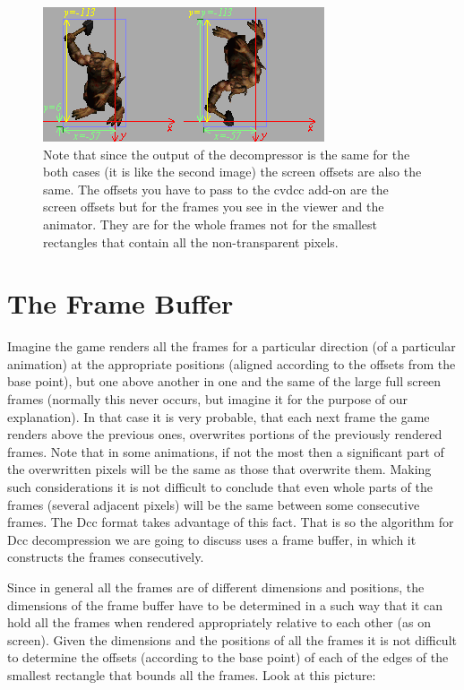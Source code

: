	
\begin{figure}[!h]
  \includegraphics[width=\linewidth]{scroffs.png}
  \caption{
Note that since the output of the decompressor is the same for the both cases 
(it is like the second image) the screen offsets are also the same. The offsets 
you have to pass to the cvdcc add-on are the screen offsets but for the frames 
you see in the viewer and the animator. They are for the whole frames not for 
the smallest rectangles that contain all the non-transparent pixels.
}
  \label{fig:offsets}
\end{figure}


\newpage
\section{The Frame Buffer}
Imagine the game renders all the frames for a particular direction (of a 
particular animation) at the appropriate positions (aligned according to the 
offsets from the base point), but one above another in one and the same of the 
large full screen frames (normally this never occurs, but imagine it for the 
purpose of our explanation). In that case it is very probable, that each next 
frame the game renders above the previous ones, overwrites portions of the 
previously rendered frames. Note that in some animations, if not the most then 
a significant part of the overwritten pixels will be the same as those that 
overwrite them. Making such considerations it is not difficult to conclude that 
even whole parts of the frames (several adjacent pixels) will be the same 
between some consecutive frames. The Dcc format takes advantage of this fact. 
That is so the algorithm for Dcc decompression we are going to discuss uses a 
frame buffer, in which it constructs the frames consecutively.

Since in general all the frames are of different dimensions and positions, the 
dimensions of the frame buffer have to be determined in a such way that it can 
hold all the frames when rendered appropriately relative to each other (as on 
screen). Given the dimensions and the positions of all the frames it is not 
difficult to determine the offsets (according to the base point) of each of the 
edges of the smallest rectangle that bounds all the frames. Look at this 
picture:


